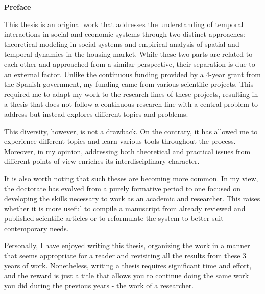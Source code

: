 \pagebreak
\thispagestyle{empty}
{}
\textbf{ \huge Preface}

\vspace*{0.5 cm}

This thesis is an original work that addresses the understanding of temporal interactions in social and economic systems through two distinct approaches: theoretical modeling in social systems and empirical analysis of spatial and temporal dynamics in the housing market. While these two parts are related to each other and approached from a similar perspective, their separation is due to an external factor. Unlike the continuous funding provided by a 4-year grant from the Spanish government, my funding came from various scientific projects. This required me to adapt my work to the research lines of these projects, resulting in a thesis that does not follow a continuous research line with a central problem to address but instead explores different topics and problems.

This diversity, however, is not a drawback. On the contrary, it has allowed me to experience different topics and learn various tools throughout the process. Moreover, in my opinion, addressing both theoretical and practical issues from different points of view enriches its interdisciplinary character.

It is also worth noting that such theses are becoming more common. In my view, the doctorate has evolved from a purely formative period to one focused on developing the skills necessary to work as an academic and researcher. This raises whether it is more useful to compile a manuscript from already reviewed and published scientific articles or to reformulate the system to better suit contemporary needs.

Personally, I have enjoyed writing this thesis, organizing the work in a manner that seems appropriate for a reader and revisiting all the results from these 3 years of work. Nonetheless, writing a thesis requires significant time and effort, and the reward is just a title that allows you to continue doing the same work you did during the previous years - the work of a researcher.



\vfill